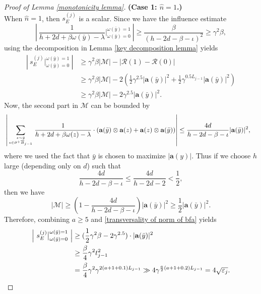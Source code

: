 \documentclass[11pt,reqno,UTF8,twoside]{amsart}
\newcommand{\bfa}{\mathbf{a}}
\newcommand{\mcR}{\mathcal{R}}
\newcommand{\mcM}{\mathcal{M}}
\newcommand{\whn}{\widehat{n}}
\newcommand{\barB}{\overline{B}}
\newcommand{\smallSj}{s^{(j)}}
\theoremstyle{definition}
\numberwithin{equation}{section}
\begin{document}
\begin{proof}[Proof of Lemma \ref{monotonicity lemma}]
\noindent \textbf{(Case 1: $\whn=1$.)}\\

\noindent When $\whn=1$, then $\smallSj_E$ is a scalar. Since we have the influence estimate 
\begin{equation}\label{value influence}
 \left| \ \frac{1}{h+2d+\beta\omega(\bar{y})-\lambda} \bigg|_{\omega(\bar{y})=0}^{\omega(\bar{y})=1}  \  \right| \geq \frac{\beta}{(h-2d-\beta-\iota)^2}\geq \gamma^2 \beta, 
\end{equation}
using the decomposition in Lemma \ref{key decomposition lemma} yields
\begin{align*}
  \left| \  \smallSj_E \big|_{\omega(\bar{y})=0}^{\omega(\bar{y})=1} \ \right| & \geq \gamma^2 \beta |\mcM| - |\mcR(1)-\mcR(0) | \\
                          &\geq \gamma^2 \beta |\mcM| -2\left( \frac{1}{2}\gamma^{2.5} |\bfa(\bar{y})|^2 + \frac{1}{2}\gamma^{0.5L_{j-1}} |\bfa(\bar{y})|^2 \right) \\
                          &  \geq \gamma^2 \beta |\mcM| -2 \gamma^{2.5} |\bfa(\bar{y})|^2.
\end{align*}
Now,   the second part in $\mcM$ can be bounded by 
\begin{align*}
  &\left|\sum_{z\sim \bar{y} \atop z\in \partial^+\barB_{j-1}} \frac{1}{h+2d+\beta\omega(z)-\lambda } \cdot(\bfa(\bar{y}) \otimes  \bfa(z)+\bfa(z)\otimes\bfa(\bar{y})  ) \right|  \leq  \frac{4d}{h-2d-\beta-\iota} |\bfa(\bar{y})|^2,
\end{align*}
where we used the fact that $\bar{y}$ is chosen to maximize $|\bfa(y)|$. Thus if we choose $h$ large (depending only on $d$) such that
\begin{equation}\label{essential barrier high 5}
  \frac{4d}{h-2d-\beta-\iota} \leq \frac{4d}{h-2d-2}<\frac{1}{2},
\end{equation}
then we  have 
\[|\mcM|\geq \left( 1- \frac{4d}{h-2d-\beta-\iota} \right) |\bfa(\bar{y})|^2 \geq \frac{1}{2}|\bfa(\bar{y})|^2 .\]
Therefore, combining $a\geq 5$ and \eqref{transversality of norm of bfa} yields
\begin{align}\label{beta dependence of height 1}
 \notag \left| \  \smallSj_E \big|_{\omega(\bar{y})=0}^{\omega(\bar{y})=1} \ \right| & \geq (\frac{1}{2}\gamma^2 \beta -2\gamma^{2.5})\cdot |\bfa(\bar{y})|^2 \\
            &\geq \frac{\beta}{4}\gamma^2 t^2_{j-1} \\
         \notag      &=\frac{\beta}{4}\gamma^2 \gamma^{2(a+1+0.1)L_{j-1}} \gg 4 \gamma^{\frac{a}{2}(a+1+0.2)L_{j-1}} = 4\sqrt{\varepsilon_{j}}.

\end{align}
\end{proof}
\end{document}
